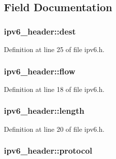 \subsection{Field Documentation}
\hypertarget{structipv6__header_ae2c5d1ad1745ee57c4be6f9e5ed46511}{
\subsubsection[{dest}]{ ipv6\+\_\+header\+::dest}}\label{structipv6__header_ae2c5d1ad1745ee57c4be6f9e5ed46511}


Definition at line 25 of file ipv6.\+h.

\hypertarget{structipv6__header_aa6ff2108b230be0d4bbafbc25ae7bc23}{
\subsubsection[{flow}]{ ipv6\+\_\+header\+::flow}}\label{structipv6__header_aa6ff2108b230be0d4bbafbc25ae7bc23}


Definition at line 18 of file ipv6.\+h.

\hypertarget{structipv6__header_a20e60988c954fcd0ee95248930ed616a}{
\subsubsection[{length}]{ ipv6\+\_\+header\+::length}}\label{structipv6__header_a20e60988c954fcd0ee95248930ed616a}


Definition at line 20 of file ipv6.\+h.

\hypertarget{structipv6__header_af41f2a0627f0f1dbd7e5fa905a090984}{
\subsubsection[{protocol}]{ ipv6\+\_\+header\+::protocol}}\label{structipv6__header_af41f2a0627f0f1dbd7e5fa905a090984}


